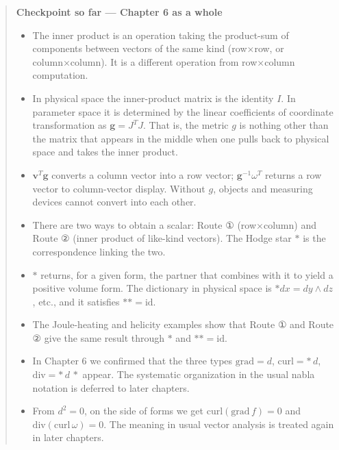 \documentclass[a4paper,12pt,openany]{book}
\begin{document}
\begin{quote}
\textbf{Checkpoint so far — Chapter 6 as a whole}

\begin{itemize}
\item
  The inner product is an operation taking the product-sum of components
  between vectors of the same kind (row×row, or column×column). It is a
  different operation from row×column computation.
\item
  In physical space the inner-product matrix is the identity \(I\). In
  parameter space it is determined by the linear coefficients of
  coordinate transformation as \(\mathbf{g}=J^T J\). That is, the metric
  \(g\) is nothing other than the matrix that appears in the middle when
  one pulls back to physical space and takes the inner product.
\item
  \(\mathbf{v}^T \mathbf{g}\) converts a column vector into a row
  vector; \(\mathbf{g}^{-1}\omega^T\) returns a row vector to
  column-vector display. Without \(g\), objects and measuring devices
  cannot convert into each other.
\item
  There are two ways to obtain a scalar: Route ① (row×column) and Route
  ② (inner product of like-kind vectors). The Hodge star \(\ast\) is the
  correspondence linking the two.
\item
  \(\ast\) returns, for a given form, the partner that combines with it
  to yield a positive volume form. The dictionary in physical space is
  \(\ast dx = dy \wedge dz\), etc., and it satisfies
  \(\ast\ast = \mathrm{id}\).
\item
  The Joule-heating and helicity examples show that Route ① and Route ②
  give the same result through \(\ast\) and \(\ast\ast = \mathrm{id}\).
\item
  In Chapter 6 we confirmed that the three types \(\mathrm{grad}=d\),
  \(\mathrm{curl}=\ast\,d\), \(\mathrm{div}=\ast\,d\,\ast\) appear. The
  systematic organization in the usual nabla notation is deferred to
  later chapters.
\item
  From \(d^2=0\), on the side of forms we get
  \(\mathrm{curl}(\mathrm{grad}\,f)=0\) and
  \(\mathrm{div}(\mathrm{curl}\,\omega)=0\). The meaning in usual vector
  analysis is treated again in later chapters.
\end{itemize}
\end{quote}

\par\vspace{0.35em}\par
\end{document}
